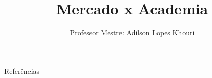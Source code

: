 \documentclass[compress, hyperref={pdfpagelayout=SinglePage}]{beamer}
\title[TCC II - Aula 02]{Mercado x Academia}
\author{Professor Mestre: Adilson Lopes Khouri}
\begin{document}
	\begin{frame}
		\titlepage
	\end{frame}
	
	
	
	
	
	
	
	
	
	
					
	

	

	\begin{frame}[allowframebreaks]{Referências}
			\tiny
			\nocite{*}
			
	    		
	\end{frame}
\end{document}
